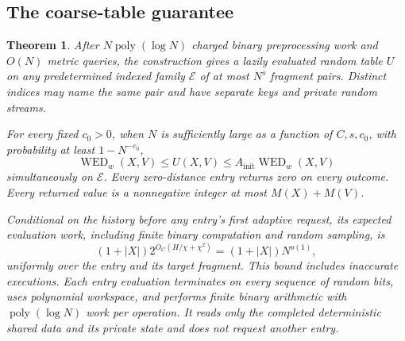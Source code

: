 \documentclass[11pt]{article}
\newtheorem{theorem}{Theorem}[section]
\theoremstyle{definition}
\newcommand{\WED}{\operatorname{WED}}
\newcommand{\1}{\mathbf 1}
\begin{document}
\subsection{The coarse-table guarantee}

\begin{theorem}\label{seed:thm:seed}
After $N\operatorname{poly}(\log N)$ charged binary preprocessing work
and $O(N)$ metric queries, the construction gives a lazily evaluated
random table $U$ on any predetermined indexed family $\mathcal E$ of at
most $N^s$ fragment pairs. Distinct indices may name the same pair and
have separate keys and private random streams.

For every fixed $c_0>0$, when $N$ is sufficiently large as a function of
$C,s,c_0$, with probability at least $1-N^{-c_0}$,
\[
 \WED_w(X,V)\le U(X,V)\le A_{\mathrm{init}}\WED_w(X,V)
\]
simultaneously on $\mathcal E$. Every zero-distance entry returns zero
on every outcome. Every returned value is a nonnegative integer at most
$M(X)+M(V)$.

Conditional on the history before any entry's first adaptive request,
its expected evaluation work, including finite binary computation and
random sampling, is
\[
 (1+|X|)2^{O_C(H/\chi+\chi^2)}=(1+|X|)N^{o(1)},
\]
uniformly over the entry and its target fragment. This bound includes
inaccurate executions. Each entry evaluation terminates on every
sequence of random bits, uses polynomial workspace, and performs finite
binary arithmetic with $\operatorname{poly}(\log N)$ work per operation.
It reads only the completed deterministic shared data and its private
state and does not request another entry.
\end{theorem}
\end{document}
